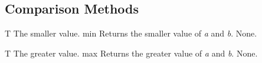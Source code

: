 \subsection{Comparison Methods}

\setNormalInstance
\setCorrectWidthThree{8pt}
\printMethodWithParamsSaved
{T}
{The smaller value.}
{min}
{Returns the smaller value of {\em a} and {\em b}.}
{None.}
\setCorrectWidthThree{4pt}

\vspace*{4ex}

\setNormalInstance
\setCorrectWidthThree{8pt}
\printMethodWithParamsSaved
{T}
{The greater value.}
{max}
{Returns the greater value of {\em a} and {\em b}.}
{None.}
\setCorrectWidthThree{4pt}
